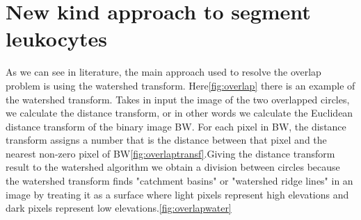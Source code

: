 \section{New kind approach to segment leukocytes}
As we can see in literature, the main approach used to resolve the overlap problem is using the watershed transform. Here\ref{fig:overlap} there is an example of the watershed transform. Takes in input the image of the two overlapped circles, we calculate the distance transform, or in other words we calculate the Euclidean distance transform of the binary image BW. For each pixel in BW, the distance transform assigns a number that is the distance between that pixel and the nearest non-zero pixel of BW\ref{fig:overlaptransf}.Giving the distance transform result to the watershed algorithm we obtain a division between circles because the watershed transform finds "catchment basins" or "watershed ridge lines" in an image by treating it as a surface where light pixels represent high elevations and dark pixels represent low elevations.\ref{fig:overlapwater}

